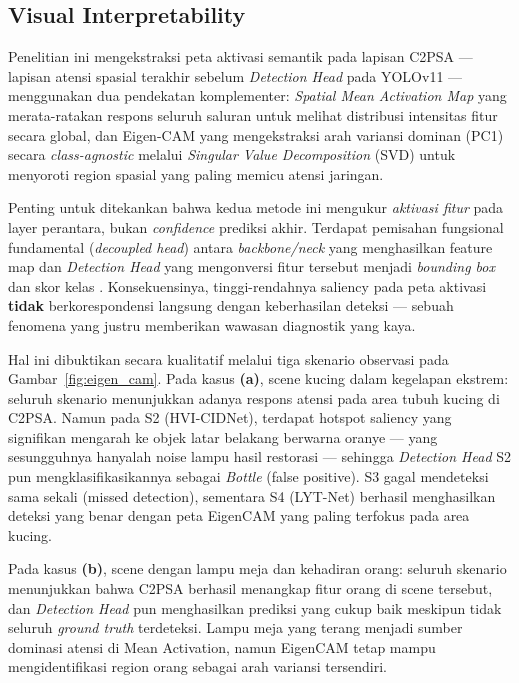 \documentclass[conference]{IEEEtran}
\begin{document}

\subsection{Visual Interpretability}
Penelitian ini mengekstraksi peta aktivasi semantik pada lapisan C2PSA — lapisan atensi spasial terakhir sebelum \textit{Detection Head} pada YOLOv11 — menggunakan dua pendekatan komplementer: \textit{Spatial Mean Activation Map} yang merata-ratakan respons seluruh saluran untuk melihat distribusi intensitas fitur secara global, dan Eigen-CAM yang mengekstraksi arah variansi dominan (PC1) secara \textit{class-agnostic} \cite{muhammad2020eigencam} melalui \textit{Singular Value Decomposition} (SVD) untuk menyoroti region spasial yang paling memicu atensi jaringan.

Penting untuk ditekankan bahwa kedua metode ini mengukur \textit{aktivasi fitur} pada layer perantara, bukan \textit{confidence} prediksi akhir. Terdapat pemisahan fungsional fundamental (\textit{decoupled head}) antara \textit{backbone/neck} yang menghasilkan feature map dan \textit{Detection Head} yang mengonversi fitur tersebut menjadi \textit{bounding box} dan skor kelas \cite{zhou2016cam}. Konsekuensinya, tinggi-rendahnya saliency pada peta aktivasi \textbf{tidak} berkorespondensi langsung dengan keberhasilan deteksi — sebuah fenomena yang justru memberikan wawasan diagnostik yang kaya.

Hal ini dibuktikan secara kualitatif melalui tiga skenario observasi pada Gambar~\ref{fig:eigen_cam}. Pada kasus \textbf{(a)}, scene kucing dalam kegelapan ekstrem: seluruh skenario menunjukkan adanya respons atensi pada area tubuh kucing di C2PSA. Namun pada S2 (HVI-CIDNet), terdapat hotspot saliency yang signifikan mengarah ke objek latar belakang berwarna oranye — yang sesungguhnya hanyalah noise lampu hasil restorasi — sehingga \textit{Detection Head} S2 pun mengklasifikasikannya sebagai \textit{Bottle} (false positive). S3 gagal mendeteksi sama sekali (missed detection), sementara S4 (LYT-Net) berhasil menghasilkan deteksi yang benar dengan peta EigenCAM yang paling terfokus pada area kucing.

Pada kasus \textbf{(b)}, scene dengan lampu meja dan kehadiran orang: seluruh skenario menunjukkan bahwa C2PSA berhasil menangkap fitur orang di scene tersebut, dan \textit{Detection Head} pun menghasilkan prediksi yang cukup baik meskipun tidak seluruh \textit{ground truth} terdeteksi. Lampu meja yang terang menjadi sumber dominasi atensi di Mean Activation, namun EigenCAM tetap mampu mengidentifikasi region orang sebagai arah variansi tersendiri.
\end{document}
